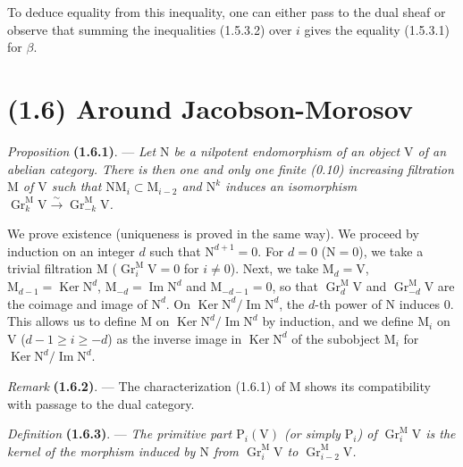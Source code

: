 \documentclass[11pt,leqno]{article}
\begin{document}
To deduce equality from this inequality, one can either pass to the dual sheaf or observe that summing the inequalities (1.5.3.2) over \(i\) gives the equality (1.5.3.1) for \(\beta\).

\section*{(1.6) Around Jacobson-Morosov}

\textit{Proposition} \textbf{(1.6.1)}. — \textit{Let \(\mathrm{N}\) be a nilpotent endomorphism of an object \(\mathrm{V}\) of an abelian category. There is then one and only one finite \textup{(0.10)} increasing filtration \(\mathrm{M}\) of \(\mathrm{V}\) such that \(\mathrm{N}\mathrm{M}_i\subset\mathrm{M}_{i-2}\) and \(\mathrm{N}^k\) induces an isomorphism \(\operatorname{Gr}_k^{\mathrm{M}}\mathrm{V}\xrightarrow{\sim}\operatorname{Gr}_{-k}^{\mathrm{M}}\mathrm{V}\).}

We prove existence (uniqueness is proved in the same way). We proceed by induction on an integer \(d\) such that \(\mathrm{N}^{d+1}=0\). For \(d=0\) (\(\mathrm{N}=0\)), we take a trivial filtration \(\mathrm{M}\) (\(\operatorname{Gr}_i^{\mathrm{M}}\mathrm{V}=0\) for \(i\ne0\)). Next, we take \(\mathrm{M}_d=\mathrm{V}\), \(\mathrm{M}_{d-1}=\operatorname{Ker}\mathrm{N}^d\), \(\mathrm{M}_{-d}=\operatorname{Im}\mathrm{N}^d\) and \(\mathrm{M}_{-d-1}=0\), so that \(\operatorname{Gr}_d^{\mathrm{M}}\mathrm{V}\) and \(\operatorname{Gr}_{-d}^{\mathrm{M}}\mathrm{V}\) are the coimage and image of \(\mathrm{N}^d\). On \(\operatorname{Ker}\mathrm{N}^d/\operatorname{Im}\mathrm{N}^d\), the \(d\)-th power of \(\mathrm{N}\) induces \(0\). This allows us to define \(\mathrm{M}\) on \(\operatorname{Ker}\mathrm{N}^d/\operatorname{Im}\mathrm{N}^d\) by induction, and we define \(\mathrm{M}_i\) on \(\mathrm{V}\) (\(d-1\ge i\ge-d\)) as the inverse image in \(\operatorname{Ker}\mathrm{N}^d\) of the subobject \(\mathrm{M}_i\) for \(\operatorname{Ker}\mathrm{N}^d/\operatorname{Im}\mathrm{N}^d\).

\textit{Remark} \textbf{(1.6.2)}. — The characterization (1.6.1) of \(\mathrm{M}\) shows its compatibility with passage to the dual category.

\textit{Definition} \textbf{(1.6.3)}. — \textit{The \textup{primitive part} \(\mathrm{P}_i(\mathrm{V})\) (or simply \(\mathrm{P}_i\)) of \(\operatorname{Gr}_i^{\mathrm{M}}\mathrm{V}\) is the kernel of the morphism induced by \(\mathrm{N}\) from \(\operatorname{Gr}_i^{\mathrm{M}}\mathrm{V}\) to \(\operatorname{Gr}_{i-2}^{\mathrm{M}}\mathrm{V}\).}
\end{document}
